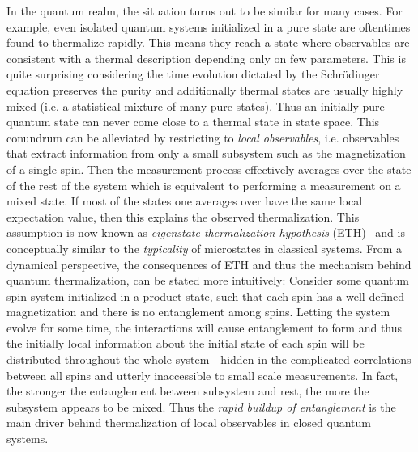 In the quantum realm, the situation turns out to be similar for many cases. For example, even isolated quantum systems initialized in a pure state are oftentimes found to thermalize rapidly. This means they reach a state where observables are consistent with a thermal description depending only on few parameters. This is quite surprising considering the time evolution dictated by the Schrödinger equation preserves the purity and additionally thermal states are usually highly mixed (i.e. a statistical mixture of many pure states). 
Thus an initially pure quantum state can never come close to a thermal state in state space. 
This conundrum can be alleviated by restricting to \emph{local observables}, i.e. observables that extract information from only a small subsystem such as the magnetization of a single spin. Then the measurement process effectively averages over the state of the rest of the system which is equivalent to performing a measurement on a mixed state. 
If most of the states one averages over have the same local expectation value, then this explains the observed thermalization. This assumption is now known as \emph{eigenstate thermalization hypothesis} (ETH)~\cite{deutschQuantumStatisticalMechanics1991,srednickiChaosQuantumThermalization1994, deutschEigenstateThermalizationHypothesis2018} and is conceptually similar to the \emph{typicality} of microstates in classical systems.
From a dynamical perspective, the consequences of ETH and thus the mechanism behind quantum thermalization, can be stated more intuitively: Consider some quantum spin system initialized in a product state, such that each spin has a well defined magnetization and there is no entanglement among spins. Letting the system evolve for some time, the interactions will cause entanglement to form and thus the initially local information about the initial state of each spin will be distributed throughout the whole system - hidden in the complicated correlations between all spins and utterly inaccessible to small scale measurements. In fact, 
the stronger the entanglement between subsystem and rest, the more the subsystem appears to be mixed.
Thus the \emph{rapid buildup of entanglement} is the main driver behind thermalization of local observables in closed quantum systems.

